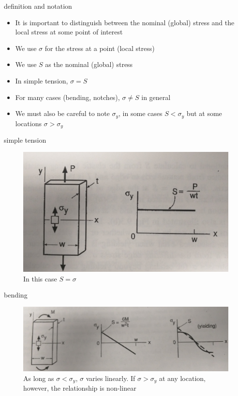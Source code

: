 \documentclass[10pt]{beamer}
\begin{document}
\begin{frame}{definition and notation}
	\begin{itemize}[<+->]
		\item It is important to distinguish between the nominal (global) stress and the local stress at some point of interest
		\item We use $\sigma$ for the stress at a point (local stress)
		\item We use $S$ as the nominal (global) stress
		\item In simple tension, $\sigma = S$ 
		\item For many cases (bending, notches), $\sigma \ne S$ in general
		\item We must also be careful to note $\sigma_y$, in some cases $S < \sigma_y$ but at some locations $\sigma > \sigma_y$
	\end{itemize}
\end{frame}

\begin{frame}{simple tension}
	\begin{figure}
	\centering
	\includegraphics[width=0.7\linewidth]{../Figures/p232-a}
	\caption{In this case $S = \sigma$}
	\label{fig:p232-a}
	\end{figure}
\end{frame}

\begin{frame}{bending}
	\begin{figure}
	\centering
	\includegraphics[width=0.7\linewidth]{../Figures/p232-b}
	\caption{As long as $\sigma < \sigma_y$, $\sigma$ varies linearly. If $\sigma > \sigma_y$ at any location, however, the relationship is non-linear}
	\label{fig:p232-b}
	\end{figure}
\end{frame}
\end{document}
